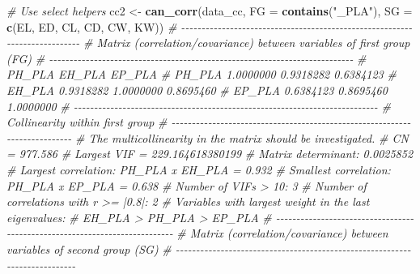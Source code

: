 \documentclass[
]{book}
\newenvironment{Shaded}{\begin{snugshade}}{\end{snugshade}}
\newcommand{\CommentTok}[1]{\textcolor[rgb]{0.56,0.35,0.01}{\textit{#1}}}
\newcommand{\DataTypeTok}[1]{\textcolor[rgb]{0.13,0.29,0.53}{#1}}
\newcommand{\KeywordTok}[1]{\textcolor[rgb]{0.13,0.29,0.53}{\textbf{#1}}}
\newcommand{\NormalTok}[1]{#1}
\newcommand{\StringTok}[1]{\textcolor[rgb]{0.31,0.60,0.02}{#1}}
\numberwithin{equation}{section}
\begin{document}
\begin{Shaded}
\begin{Highlighting}[]
\CommentTok{\# Use select helpers}
\NormalTok{cc2 \textless{}{-}}\StringTok{ }
\StringTok{  }\KeywordTok{can\_corr}\NormalTok{(data\_cc,}
           \DataTypeTok{FG =} \KeywordTok{contains}\NormalTok{(}\StringTok{"\_PLA"}\NormalTok{),}
           \DataTypeTok{SG =} \KeywordTok{c}\NormalTok{(EL, ED, CL, CD, CW, KW))}
\CommentTok{\# {-}{-}{-}{-}{-}{-}{-}{-}{-}{-}{-}{-}{-}{-}{-}{-}{-}{-}{-}{-}{-}{-}{-}{-}{-}{-}{-}{-}{-}{-}{-}{-}{-}{-}{-}{-}{-}{-}{-}{-}{-}{-}{-}{-}{-}{-}{-}{-}{-}{-}{-}{-}{-}{-}{-}{-}{-}{-}{-}{-}{-}{-}{-}{-}{-}{-}{-}{-}{-}{-}{-}{-}{-}{-}{-}}
\CommentTok{\# Matrix (correlation/covariance) between variables of first group (FG)}
\CommentTok{\# {-}{-}{-}{-}{-}{-}{-}{-}{-}{-}{-}{-}{-}{-}{-}{-}{-}{-}{-}{-}{-}{-}{-}{-}{-}{-}{-}{-}{-}{-}{-}{-}{-}{-}{-}{-}{-}{-}{-}{-}{-}{-}{-}{-}{-}{-}{-}{-}{-}{-}{-}{-}{-}{-}{-}{-}{-}{-}{-}{-}{-}{-}{-}{-}{-}{-}{-}{-}{-}{-}{-}{-}{-}{-}{-}}
\CommentTok{\#           PH\_PLA    EH\_PLA    EP\_PLA}
\CommentTok{\# PH\_PLA 1.0000000 0.9318282 0.6384123}
\CommentTok{\# EH\_PLA 0.9318282 1.0000000 0.8695460}
\CommentTok{\# EP\_PLA 0.6384123 0.8695460 1.0000000}
\CommentTok{\# {-}{-}{-}{-}{-}{-}{-}{-}{-}{-}{-}{-}{-}{-}{-}{-}{-}{-}{-}{-}{-}{-}{-}{-}{-}{-}{-}{-}{-}{-}{-}{-}{-}{-}{-}{-}{-}{-}{-}{-}{-}{-}{-}{-}{-}{-}{-}{-}{-}{-}{-}{-}{-}{-}{-}{-}{-}{-}{-}{-}{-}{-}{-}{-}{-}{-}{-}{-}{-}{-}{-}{-}{-}{-}{-}}
\CommentTok{\# Collinearity within first group }
\CommentTok{\# {-}{-}{-}{-}{-}{-}{-}{-}{-}{-}{-}{-}{-}{-}{-}{-}{-}{-}{-}{-}{-}{-}{-}{-}{-}{-}{-}{-}{-}{-}{-}{-}{-}{-}{-}{-}{-}{-}{-}{-}{-}{-}{-}{-}{-}{-}{-}{-}{-}{-}{-}{-}{-}{-}{-}{-}{-}{-}{-}{-}{-}{-}{-}{-}{-}{-}{-}{-}{-}{-}{-}{-}{-}{-}{-}}
\CommentTok{\# The multicollinearity in the matrix should be investigated.}
\CommentTok{\# CN = 977.586}
\CommentTok{\# Largest VIF = 229.164618380199}
\CommentTok{\# Matrix determinant: 0.0025852 }
\CommentTok{\# Largest correlation: PH\_PLA x EH\_PLA = 0.932 }
\CommentTok{\# Smallest correlation: PH\_PLA x EP\_PLA = 0.638 }
\CommentTok{\# Number of VIFs \textgreater{} 10: 3 }
\CommentTok{\# Number of correlations with r \textgreater{}= |0.8|: 2 }
\CommentTok{\# Variables with largest weight in the last eigenvalues: }
\CommentTok{\# EH\_PLA \textgreater{} PH\_PLA \textgreater{} EP\_PLA }
\CommentTok{\# {-}{-}{-}{-}{-}{-}{-}{-}{-}{-}{-}{-}{-}{-}{-}{-}{-}{-}{-}{-}{-}{-}{-}{-}{-}{-}{-}{-}{-}{-}{-}{-}{-}{-}{-}{-}{-}{-}{-}{-}{-}{-}{-}{-}{-}{-}{-}{-}{-}{-}{-}{-}{-}{-}{-}{-}{-}{-}{-}{-}{-}{-}{-}{-}{-}{-}{-}{-}{-}{-}{-}{-}{-}{-}{-}}
\CommentTok{\# Matrix (correlation/covariance) between variables of second group (SG)}
\CommentTok{\# {-}{-}{-}{-}{-}{-}{-}{-}{-}{-}{-}{-}{-}{-}{-}{-}{-}{-}{-}{-}{-}{-}{-}{-}{-}{-}{-}{-}{-}{-}{-}{-}{-}{-}{-}{-}{-}{-}{-}{-}{-}{-}{-}{-}{-}{-}{-}{-}{-}{-}{-}{-}{-}{-}{-}{-}{-}{-}{-}{-}{-}{-}{-}{-}{-}{-}{-}{-}{-}{-}{-}{-}{-}{-}{-}}

\end{Highlighting}
\end{Shaded}
\end{document}
